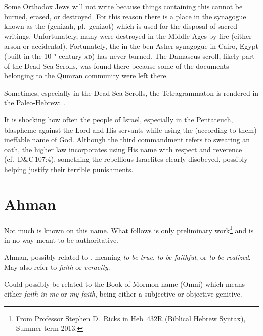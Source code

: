 Some Orthodox Jews will not write  because things containing this cannot be burned, erased, or destroyed. For this reason there is a place in the synagogue known as the  (genizah, pl.\ genizot) which is used for the disposal of sacred writings. Unfortunately, many  were destroyed in the Middle Ages by fire (either arson or accidental). Fortunately, the  in the ben-Asher synagogue in Cairo, Egypt (built in the 10$^\text{th}$ century \textsc{ad}) has never burned. The Damascus scroll, likely part of the Dead Sea Scrolls, was found there because some of the documents belonging to the Qumran community were left there.

Sometimes, especially in the Dead Sea Scrolls, the Tetragrammaton is rendered in the Paleo-Hebrew: .

It is shocking how often the people of Israel, especially in the Pentateuch, blaspheme against the Lord and His servants while using the (according to them) ineffable name of God. Although the third commandment refers to swearing an oath, the higher law incorporates using His name with respect and reverence (cf.~D\&C\,107:4), something the rebellious Israelites clearly disobeyed, possibly helping justify their terrible punishments.

\section{Ahman}
Not much is known on this name. What follows is only preliminary work\footnote{From Professor Stephen D.\ Ricks in Heb~432R (Biblical Hebrew Syntax), Summer term 2013.} and is in no way meant to be authoritative.

Ahman, possibly related to , meaning \emph{to be true}, \emph{to be faithful}, or \emph{to be realized}. May also refer to \emph{faith} or \emph{veracity}.

Could possibly be related to the Book of Mormon name  (Omni) which means either \emph{faith in me} or \emph{my faith},  being either a subjective or objective genitive.
